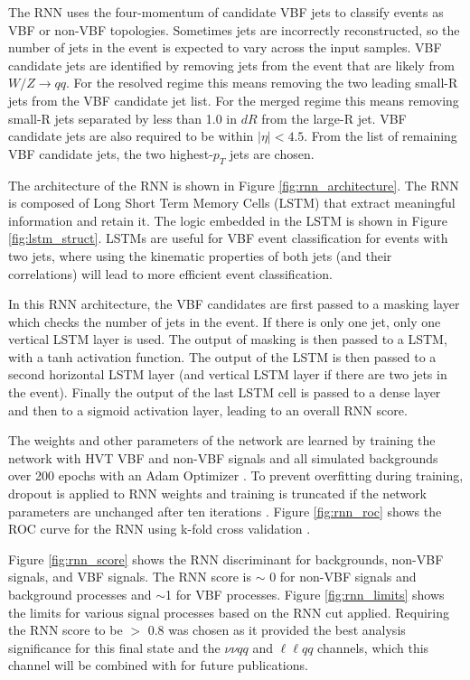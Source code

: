 The RNN uses the four-momentum of candidate VBF jets to classify events as VBF or non-VBF topologies. Sometimes jets are incorrectly reconstructed, so the number of jets in the event is expected to vary across the input samples. VBF candidate jets are identified by removing jets from the event that are likely from $W/Z \rightarrow qq$. For the resolved regime this means removing the two leading small-R jets from the VBF candidate jet list. For the merged regime this means removing small-R jets separated by less than 1.0 in $dR$ from the large-R jet. VBF candidate jets are also required to be within $|\eta| < 4.5$. From the list of remaining VBF candidate jets, the two highest-$p_{T}$ jets are chosen. 

The architecture of the RNN is shown in Figure \ref{fig:rnn_architecture}. The RNN is composed of Long Short Term Memory Cells (LSTM) that extract meaningful information and retain it. The logic embedded in the LSTM is shown in Figure \ref{fig:lstm_struct}. LSTMs are useful for VBF event classification for events with two jets, where using the kinematic properties of both jets (and their correlations) will lead to more efficient event classification.

In this RNN architecture, the VBF candidates are first passed to a masking layer which checks the number of jets in the event. If there is only one jet, only one vertical LSTM layer is used. The output of masking is then passed to a LSTM, with a tanh activation function. The output of the LSTM is then passed to a second horizontal LSTM layer (and vertical LSTM layer if there are two jets in the event). Finally the output of the last LSTM cell is passed to a dense layer and then to a sigmoid activation layer, leading to an overall RNN score.

The weights and other parameters of the network are learned by training the network with HVT VBF and non-VBF signals and all simulated backgrounds over 200 epochs with an Adam Optimizer \cite{adamopt}. To prevent overfitting during training, dropout is applied to RNN weights and training is truncated if the network parameters are unchanged after ten iterations \cite{rnndropout}. Figure \ref{fig:rnn_roc} shows the ROC curve for the RNN using k-fold cross validation \cite{kfold}. 

 Figure \ref{fig:rnn_score} shows the RNN discriminant for backgrounds, non-VBF signals, and VBF signals. The RNN score is $\sim$ 0 for non-VBF signals and background processes and $\sim$1 for VBF processes. Figure \ref{fig:rnn_limits} shows the limits for various signal processes based on the RNN cut applied. Requiring the RNN score to be $>$ 0.8 was chosen as it provided the best analysis significance for this final state and the $\nu\nu qq$ and $\ell \ell qq$ channels, which this channel will be combined with for future publications.


